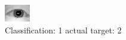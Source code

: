 \begin{figure}[h!]
\begin{center}
\includegraphics[width=0.60\columnwidth]{figures/ID958_class_1_target_2.png}
\end{center}
\caption{ Classification: 1 actual target: 2}
\label{fig:ID958_class_1_target_2}
\end{figure}
